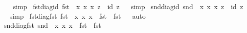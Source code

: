 \begin{isabellebody}
%
\isadelimproof
\ \ %
\endisadelimproof
%
\isatagproof
{}\isamarkupfalse%
\ simp%
\endisatagproof
{\isafoldproof}%
%
\isadelimproof
\isanewline
%
\endisadelimproof
\isanewline
{}\isamarkupfalse%
\ fst{\isacharunderscore}{\kern0pt}diag{\isacharunderscore}{\kern0pt}id{\isacharcolon}{\kern0pt}\ {\isachardoublequoteopen}{\isacharparenleft}{\kern0pt}fst\ {\isasymcirc}\ {\isacharparenleft}{\kern0pt}{\isasymlambda}x{\isachardot}{\kern0pt}\ {\isacharparenleft}{\kern0pt}x{\isacharcomma}{\kern0pt}\ x{\isacharparenright}{\kern0pt}{\isacharparenright}{\kern0pt}{\isacharparenright}{\kern0pt}\ z\ {\isacharequal}{\kern0pt}\ id\ z{\isachardoublequoteclose}%
\isadelimproof
\ %
\endisadelimproof
%
\isatagproof
{}\isamarkupfalse%
\ simp%
\endisatagproof
{\isafoldproof}%
%
\isadelimproof
%
\endisadelimproof
\isanewline
{}\isamarkupfalse%
\ snd{\isacharunderscore}{\kern0pt}diag{\isacharunderscore}{\kern0pt}id{\isacharcolon}{\kern0pt}\ {\isachardoublequoteopen}{\isacharparenleft}{\kern0pt}snd\ {\isasymcirc}\ {\isacharparenleft}{\kern0pt}{\isasymlambda}x{\isachardot}{\kern0pt}\ {\isacharparenleft}{\kern0pt}x{\isacharcomma}{\kern0pt}\ x{\isacharparenright}{\kern0pt}{\isacharparenright}{\kern0pt}{\isacharparenright}{\kern0pt}\ z\ {\isacharequal}{\kern0pt}\ id\ z{\isachardoublequoteclose}%
\isadelimproof
\ %
\endisadelimproof
%
\isatagproof
{}\isamarkupfalse%
\ simp%
\endisatagproof
{\isafoldproof}%
%
\isadelimproof
%
\endisadelimproof
\isanewline
\isanewline
{}\isamarkupfalse%
\ fst{\isacharunderscore}{\kern0pt}diag{\isacharunderscore}{\kern0pt}fst{\isacharcolon}{\kern0pt}\ {\isachardoublequoteopen}fst\ {\isasymcirc}\ {\isacharparenleft}{\kern0pt}{\isacharparenleft}{\kern0pt}{\isasymlambda}x{\isachardot}{\kern0pt}\ {\isacharparenleft}{\kern0pt}x{\isacharcomma}{\kern0pt}\ x{\isacharparenright}{\kern0pt}{\isacharparenright}{\kern0pt}\ {\isasymcirc}\ fst{\isacharparenright}{\kern0pt}\ {\isacharequal}{\kern0pt}\ fst{\isachardoublequoteclose}%
\isadelimproof
\ %
\endisadelimproof
%
\isatagproof
{}\isamarkupfalse%
\ auto%
\endisatagproof
{\isafoldproof}%
%
\isadelimproof
%
\endisadelimproof
\isanewline
{}\isamarkupfalse%
\ snd{\isacharunderscore}{\kern0pt}diag{\isacharunderscore}{\kern0pt}fst{\isacharcolon}{\kern0pt}\ {\isachardoublequoteopen}snd\ {\isasymcirc}\ {\isacharparenleft}{\kern0pt}{\isacharparenleft}{\kern0pt}{\isasymlambda}x{\isachardot}{\kern0pt}\ {\isacharparenleft}{\kern0pt}x{\isacharcomma}{\kern0pt}\ x{\isacharparenright}{\kern0pt}{\isacharparenright}{\kern0pt}\ {\isasymcirc}\ fst{\isacharparenright}{\kern0pt}\ {\isacharequal}{\kern0pt}\ fst{\isachardoublequoteclose}%

\end{isabellebody}
